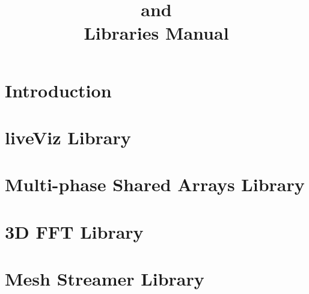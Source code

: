 \documentclass[10pt]{report}
\title{\converse{} and \charmpp{}\\ Libraries Manual}
\begin{document}
\maketitle

\chapter{Introduction}

\chapter{liveViz Library}

\chapter{Multi-phase Shared Arrays Library}

\chapter{3D FFT Library}

\chapter{Mesh Streamer Library}



\end{document}
